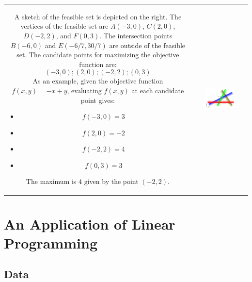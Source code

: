 \documentclass{article}
\begin{document}
\begin{tabular}{cc}
\parbox{0.4\textwidth}{
A sketch of the feasible set is depicted on the right. The vertices of the feasible set are \(A(-3,0)\), \(C(2,0)\), \(D(-2,2)\), and \(F(0,3)\). The intersection points \(B(-6,0)\) and \(E(-6/7,30/7)\) are outside of the feasible set. The candidate points for maximizing the objective function are:  
\[(-3,0); (2,0); (-2,2); (0,3)\]
As an example, given the objective function \(f(x,y) = -x + y\), evaluating \(f(x,y)\) at each candidate point gives:
\begin{itemize}
\item \(f(-3,0) = 3\)
\item \(f(2,0) = -2\)
\item \(f(-2,2) = 4\)
\item \(f(0,3) = 3\)
\end{itemize}
The maximum is \(4\) given by the point \((-2, 2)\).
} & \parbox{0.6\textwidth}{
\includegraphics[width = 0.6\textwidth]{feasible_set_6}
}
\end{tabular}




\section*{An Application of Linear Programming}

\subsection*{Data}
\end{document}
